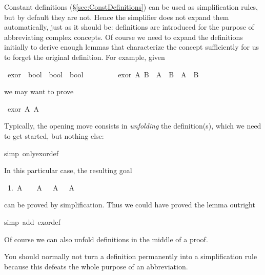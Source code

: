 \begin{isabelle}%
%
\begin{isamarkuptext}%
\noindent Constant definitions (\S\ref{sec:ConstDefinitions}) can
be used as simplification rules, but by default they are not.  Hence the
simplifier does not expand them automatically, just as it should be:
definitions are introduced for the purpose of abbreviating complex
concepts. Of course we need to expand the definitions initially to derive
enough lemmas that characterize the concept sufficiently for us to forget the
original definition. For example, given%
\end{isamarkuptext}%
\ exor\ {\isacharcolon}{\isacharcolon}\ {\isachardoublequote}bool\ {\isasymRightarrow}\ bool\ {\isasymRightarrow}\ bool{\isachardoublequote}\isanewline
\ \ \ \ \ \ \ \ \ {\isachardoublequote}exor\ A\ B\ {\isasymequiv}\ {\isacharparenleft}A\ {\isasymand}\ {\isasymnot}B{\isacharparenright}\ {\isasymor}\ {\isacharparenleft}{\isasymnot}A\ {\isasymand}\ B{\isacharparenright}{\isachardoublequote}%
\begin{isamarkuptext}%
\noindent
we may want to prove%
\end{isamarkuptext}%
\ {\isachardoublequote}exor\ A\ {\isacharparenleft}{\isasymnot}A{\isacharparenright}{\isachardoublequote}%
\begin{isamarkuptxt}%
\noindent
Typically, the opening move consists in \emph{unfolding} the definition(s), which we need to
get started, but nothing else:%
\end{isamarkuptxt}%
simp\ only{\isacharcolon}exor{\isacharunderscore}def{\isacharparenright}%
\begin{isamarkuptxt}%
\noindent
In this particular case, the resulting goal
\begin{isabellepar}%
~1.~A~{\isasymand}~{\isasymnot}~{\isasymnot}~A~{\isasymor}~{\isasymnot}~A~{\isasymand}~{\isasymnot}~A%
\end{isabellepar}%
can be proved by simplification. Thus we could have proved the lemma outright%
\end{isamarkuptxt}%
simp\ add{\isacharcolon}\ exor{\isacharunderscore}def{\isacharparenright}%
\begin{isamarkuptext}%
\noindent
Of course we can also unfold definitions in the middle of a proof.

You should normally not turn a definition permanently into a simplification
rule because this defeats the whole purpose of an abbreviation.%
\end{isamarkuptext}%
\end{isabelle}%

